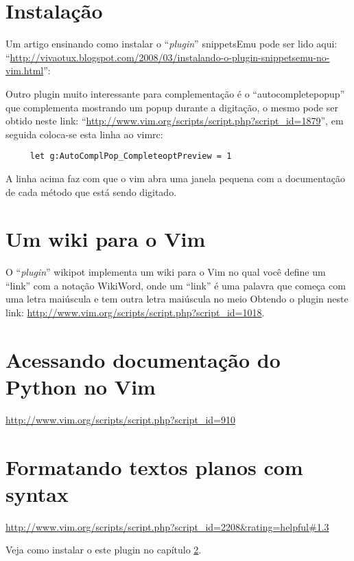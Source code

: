 \section{Instalação}
\label{Instalação}

Um artigo ensinando como instalar o ``{\em plugin}'' snippetsEmu pode ser lido aqui:
 ``\url{http://vivaotux.blogspot.com/2008/03/instalando-o-plugin-snippetsemu-no-vim.html}'':

Outro plugin muito interessante para complementação é o ``autocompletepopup'' que complementa 
mostrando um popup durante a digitação, o mesmo pode ser obtido neste link:
``\url{http://www.vim.org/scripts/script.php?script\_id=1879}'', em seguida coloca-se esta 
linha ao vimrc:

\begin{verbatim}
     let g:AutoComplPop_CompleteoptPreview = 1
\end{verbatim}

A linha acima faz com que o vim abra uma janela pequena com a documentação
de cada método que está sendo digitado.

\section{Um wiki para o Vim}
\label{sec:Um wiki para o Vim}

O ``{\em plugin}'' wikipot implementa um wiki para o Vim no qual você define
um ``link'' com a notação WikiWord, onde um ``link'' é uma palavra que
começa com uma letra maiúscula e tem outra letra maiúscula no meio
Obtendo o plugin neste link: \url{http://www.vim.org/scripts/script.php?script\_id=1018}.

\section{Acessando documentação do Python no Vim}
\label{Acessando documentação do Python no Vim}

 \url{http://www.vim.org/scripts/script.php?script\_id=910}

\section{Formatando textos planos com syntax}
\label{Formatando textos planos com syntax}
\url{http://www.vim.org/scripts/script.php?script\_id=2208&rating=helpful#1.3}

Veja como instalar o este plugin no capítulo \ref{sec:Um wiki para o Vim}.


